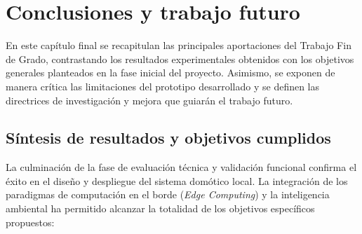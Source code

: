 \newpage
\section{Conclusiones y trabajo futuro}
\label{cap:conclusiones}

En este capítulo final se recapitulan las principales aportaciones del Trabajo Fin de Grado, contrastando los resultados experimentales obtenidos con los objetivos generales planteados en la fase inicial del proyecto. Asimismo, se exponen de manera crítica las limitaciones del prototipo desarrollado y se definen las directrices de investigación y mejora que guiarán el trabajo futuro.

\subsection{Síntesis de resultados y objetivos cumplidos}

La culminación de la fase de evaluación técnica y validación funcional confirma el éxito en el diseño y despliegue del sistema domótico local. La integración de los paradigmas de computación en el borde (\textit{Edge Computing}) y la inteligencia ambiental ha permitido alcanzar la totalidad de los objetivos específicos propuestos:

